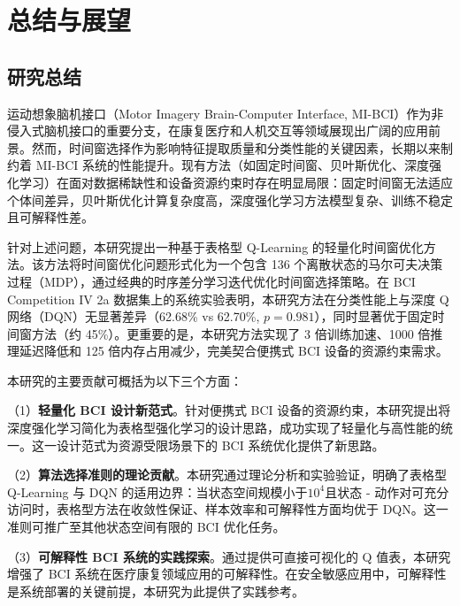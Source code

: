 
\chapter{总结与展望}
\label{chap:conclusion}

\section{研究总结}
\label{sec:summary}

运动想象脑机接口（Motor Imagery Brain-Computer Interface, MI-BCI）作为非侵入式脑机接口的重要分支，在康复医疗和人机交互等领域展现出广阔的应用前景。然而，时间窗选择作为影响特征提取质量和分类性能的关键因素，长期以来制约着 MI-BCI 系统的性能提升。现有方法（如固定时间窗、贝叶斯优化、深度强化学习）在面对数据稀缺性和设备资源约束时存在明显局限：固定时间窗无法适应个体间差异，贝叶斯优化计算复杂度高，深度强化学习方法模型复杂、训练不稳定且可解释性差。

针对上述问题，本研究提出一种基于表格型 Q-Learning 的轻量化时间窗优化方法。该方法将时间窗优化问题形式化为一个包含 136 个离散状态的马尔可夫决策过程（MDP），通过经典的时序差分学习迭代优化时间窗选择策略。在 BCI Competition IV 2a 数据集上的系统实验表明，本研究方法在分类性能上与深度 Q 网络（DQN）无显著差异（62.68\% vs 62.70\%, $p = 0.981$），同时显著优于固定时间窗方法（约 45\%）。更重要的是，本研究方法实现了 3 倍训练加速、1000 倍推理延迟降低和 125 倍内存占用减少，完美契合便携式 BCI 设备的资源约束需求。

本研究的主要贡献可概括为以下三个方面：

（1）\textbf{轻量化 BCI 设计新范式}。针对便携式 BCI 设备的资源约束，本研究提出将深度强化学习简化为表格型强化学习的设计思路，成功实现了轻量化与高性能的统一。这一设计范式为资源受限场景下的 BCI 系统优化提供了新思路。

（2）\textbf{算法选择准则的理论贡献}。本研究通过理论分析和实验验证，明确了表格型 Q-Learning 与 DQN 的适用边界：当状态空间规模小于$10^4$且状态 - 动作对可充分访问时，表格型方法在收敛性保证、样本效率和可解释性方面均优于 DQN。这一准则可推广至其他状态空间有限的 BCI 优化任务。

（3）\textbf{可解释性 BCI 系统的实践探索}。通过提供可直接可视化的 Q 值表，本研究增强了 BCI 系统在医疗康复领域应用的可解释性。在安全敏感应用中，可解释性是系统部署的关键前提，本研究为此提供了实践参考。

